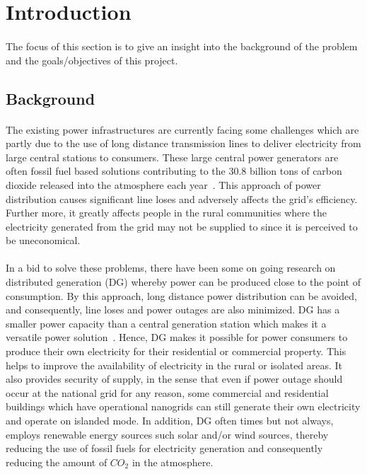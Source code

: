 \documentclass[titlepage]{article}
\begin{document}
\section{Introduction}
\paragraph{} The focus of this section is to give an insight into the background of the problem and the goals/objectives of this project.

\subsection{Background}
\paragraph{} The existing power infrastructures are currently facing some challenges which are partly due to the use of long distance transmission lines to deliver electricity from large central stations to consumers. These large central power generators are often fossil fuel based solutions contributing to the 30.8 billion tons of carbon dioxide released into the atmosphere each year~\cite{Friedlingstein}. This approach of power distribution causes significant line loses and adversely affects the grid's efficiency. Further more, it greatly affects people in the rural communities where the electricity generated from the grid may not be supplied to since it is perceived to be uneconomical.
\paragraph{}In a bid to solve these problems, there have been some on going research on distributed generation (DG) whereby power can be produced close to the point of consumption. By this approach, long distance power distribution can be avoided, and consequently, line loses and power outages are also minimized.  DG has a smaller power capacity than a central generation station which makes it a versatile power solution~\cite{Paliwal}. Hence, DG  makes it possible for power consumers to produce their own electricity for their residential or commercial property. This helps to improve the availability of electricity in the rural or isolated areas. It also provides security of supply, in the sense that even if power outage should occur at the national grid for any reason, some commercial and residential buildings which have operational nanogrids can still generate their own electricity and operate on islanded mode. In addition, DG often times but not always, employs renewable energy sources such solar and/or wind sources, thereby reducing the use of fossil fuels for electricity generation and consequently reducing the amount of $CO_{2}$ in the atmosphere. 
\end{document}
